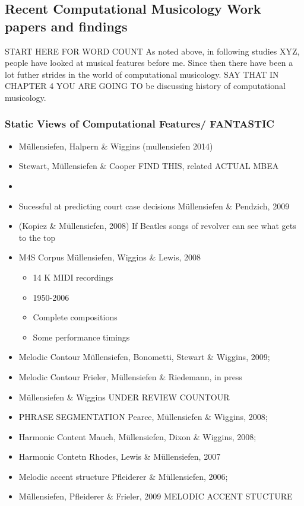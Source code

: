 \documentclass[]{book}
\providecommand{\tightlist}{%
  \setlength{\itemsep}{0pt}\setlength{\parskip}{0pt}}
\theoremstyle{definition}
\theoremstyle{definition}
\theoremstyle{definition}
\theoremstyle{remark}
\begin{document}
\hypertarget{recent-computational-musicology-work-papers-and-findings}{%
\subsection{Recent Computational Musicology Work papers and
findings}\label{recent-computational-musicology-work-papers-and-findings}}

START HERE FOR WORD COUNT As noted above, in following studies XYZ,
people have looked at musical features before me. Since then there have
been a lot futher strides in the world of computational musicology. SAY
THAT IN CHAPTER 4 YOU ARE GOING TO be discussing history of
computational musicology.

\hypertarget{static-views-of-computational-features-fantastic}{%
\subsubsection{Static Views of Computational Features/
FANTASTIC}\label{static-views-of-computational-features-fantastic}}

\begin{itemize}
\item
  Müllensiefen, Halpern \& Wiggins (mullensiefen 2014)
\item
  Stewart, Müllensiefen \& Cooper FIND THIS, related ACTUAL MBEA
\item
\item
  Sucessful at predicting court case decisions Müllensiefen \& Pendzich,
  2009
\item
  (Kopiez \& Müllensiefen, 2008) If Beatles songs of revolver can see
  what gets to the top
\item
  M4S Corpus Müllensiefen, Wiggins \& Lewis, 2008

  \begin{itemize}
  \tightlist
  \item
    14 K MIDI recordings
  \item
    1950-2006
  \item
    Complete compositions
  \item
    Some performance timings
  \end{itemize}
\item
  Melodic Contour Müllensiefen, Bonometti, Stewart \& Wiggins, 2009;
\item
  Melodic Contour Frieler, Müllensiefen \& Riedemann, in press
\item
  Müllensiefen \& Wiggins UNDER REVIEW COUNTOUR
\item
  PHRASE SEGMENTATION Pearce, Müllensiefen \& Wiggins, 2008;
\item
  Harmonic Content Mauch, Müllensiefen, Dixon \& Wiggins, 2008;
\item
  Harmonic Contetn Rhodes, Lewis \& Müllensiefen, 2007
\item
  Melodic accent structure Pfleiderer \& Müllensiefen, 2006;
\item
  Müllensiefen, Pfleiderer \& Frieler, 2009 MELODIC ACCENT STUCTURE
\end{itemize}
\end{document}
